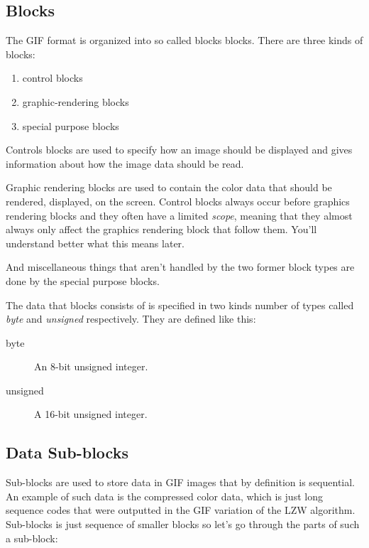 \begin{refsection}
  \subsection{Blocks}

  The GIF format is organized into so called blocks blocks. There are three kinds of
  blocks:

  \begin{enumerate}
  \item control blocks
  \item graphic-rendering blocks
  \item special purpose blocks
  \end{enumerate}

  Controls blocks are used to specify how an image should be displayed
  and gives information about how the image data should be read.

  Graphic rendering blocks are used to contain the color data that
  should be rendered, displayed, on the screen. Control blocks always
  occur before graphics rendering blocks and they often have a limited
  \textit{scope}, meaning that they almost always only affect the
  graphics rendering block that follow them. You'll understand better
  what this means later.

  And miscellaneous things that aren't handled by the two former
  block types are done by the special purpose blocks.

  The data that blocks consists of is specified in two kinds number of
  types called \textit{byte} and \textit{unsigned} respectively. They
  are defined like this:

  \begin{description}
  \item[byte] An 8-bit unsigned integer.
  \item[unsigned] A 16-bit unsigned integer.
  \end{description}

  \subsection{Data Sub-blocks}
  \label{sec:gif-data-sub-blocks}

  Sub-blocks are used to store data in GIF images that by definition
  is sequential. An example of such data is the compressed color data,
  which is just long sequence codes that were outputted in the GIF
  variation of the LZW algorithm. Sub-blocks is just sequence of
  smaller blocks so let's go through the parts of such a sub-block:


\end{refsection}
